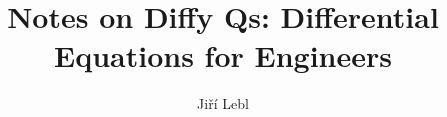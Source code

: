 \documentclass[12pt]{book}
\author{Ji\v{r}\'i Lebl}
\title{Notes on Diffy Qs: Differential Equations for Engineers}
\begin{document}


\newcommand{\theversion}{6.11}
\newcommand{\theedition}{6}
\makediffytitlepage

\newpage

\vspace*{\fill}
\end{document}
